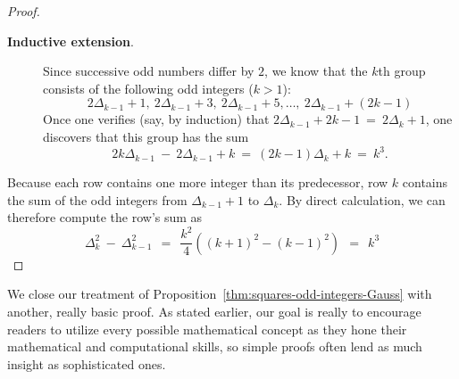 \begin{proof}
\begin{description}
\item[{\bf Inductive extension}.]
%
Since successive odd numbers differ by $2$, we know that the $k$th
group consists of the following odd integers ($k>1$):
\[
2 \Delta_{k-1} +1, \ 2 \Delta_{k-1}  +3, \ 2 \Delta_{k-1}  +5 ,
\ldots, \
2 \Delta_{k-1} + (2k-1)
\]
Once one verifies (say, by induction) that $2 \Delta_{k-1} +2k-1 \ = \ 2
\Delta_{k} +1$, one discovers that this group has the sum
\[
2k \Delta_{k-1} \ - \ 2 \Delta_{k-1} +k \ = \
(2k -1) \Delta_k + k \ = \ k^3.
\]
\end{description}


Because each row contains one more integer than its predecessor, row
$k$ contains the sum of the odd integers from $\Delta_{k-1}+1$ to
$\Delta_k$.  By direct calculation, we can therefore compute the row's
sum as
\[
\Delta_k^2 \ - \ \Delta_{k-1}^2 
 \ \ =  \ \ \frac{k^2}{4} \left( (k+1)^2 - (k-1)^2 \right)
 \ \ = \ \ k^3
\]
\end{proof}

\medskip

We close our treatment of
Proposition~\ref{thm:squares-odd-integers-Gauss} with another, really
basic proof.  As stated earlier, our goal is really to encourage
readers to utilize every possible mathematical concept as they hone
their mathematical and computational skills, so simple proofs often
lend as much insight as sophisticated ones.

\medskip

